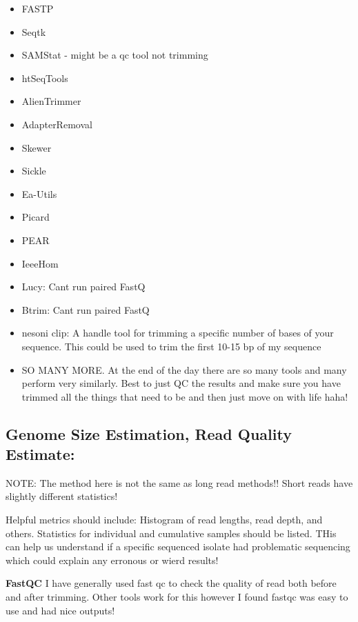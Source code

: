 \documentclass{article}
\begin{document}
\begin{itemize}
\begin{enumerate}
            \end{enumerate}
        \item FASTP
        \item Seqtk
        \item SAMStat - might be a qc tool not trimming
        \item htSeqTools 
        \item AlienTrimmer
        \item AdapterRemoval
        \item Skewer
        \item Sickle
        \item Ea-Utils
        \item Picard
        \item PEAR 
        \item IeeeHom
        \item Lucy:  Cant run paired FastQ 
        \item Btrim:  Cant run paired FastQ
        \item nesoni clip:   A handle tool for trimming a specific number of bases of your sequence.   This could be used to trim the first 10-15 bp of my sequence
        \item SO MANY MORE.   At the end of the day there are so many tools and many perform very similarly.   Best to just QC the results and make sure you have trimmed all the things that need to be and then just move on with life haha!


    \end{itemize}




    \subsection{\textbf{Genome Size Estimation, Read Quality Estimate:}}
        
        NOTE: The method here is not the same as long read methods!!   Short reads have slightly different statistics!

        Helpful metrics should include:  Histogram of read lengths, read depth, and others.  Statistics for individual and cumulative samples should be listed.  THis can help us understand if a specific sequenced isolate had problematic sequencing which could explain any erronous or wierd results!


        \textbf{FastQC}  I have generally used fast qc to check the quality of read both before and after trimming.   Other tools work for this however I found fastqc was easy to use and had nice outputs!
    
\end{document}

